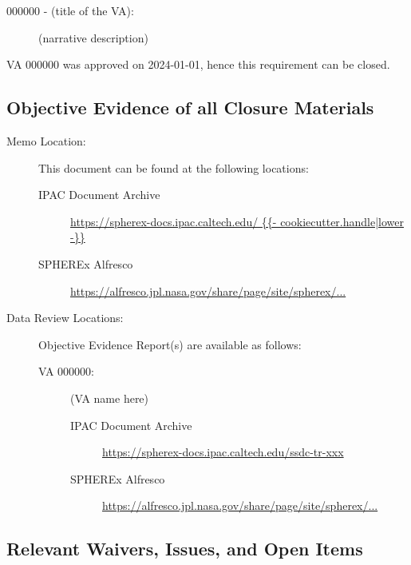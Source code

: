 \documentclass[TR]{spherex}
\begin{document}
\begin{small}
\begin{description}
  \item[000000 - (title of the VA):] (narrative description)
\end{description}

\noindent VA 000000 was approved on 2024-01-01, hence this requirement can be closed.


\subsection*{Objective Evidence of all Closure Materials}


\begin{description}
  \item[Memo Location:] This document can be found at the following locations:
    \begin{description}
      \item[IPAC Document Archive] \url{https://spherex-docs.ipac.caltech.edu/ {{- cookiecutter.handle|lower -}} }
      \item[SPHEREx Alfresco] \url{https://alfresco.jpl.nasa.gov/share/page/site/spherex/...}
    \end{description}
  \item[Data Review Locations:] Objective Evidence Report(s) are available as follows:
    \begin{description}
      \item[VA 000000:] (VA name here)
        \begin{description}
          \item[IPAC Document Archive] \url{https://spherex-docs.ipac.caltech.edu/ssdc-tr-xxx}
          \item[SPHEREx Alfresco] \url{https://alfresco.jpl.nasa.gov/share/page/site/spherex/...}
        \end{description}
    \end{description}
\end{description}


\subsection*{Relevant Waivers, Issues, and Open Items}


\end{small}
\end{document}
